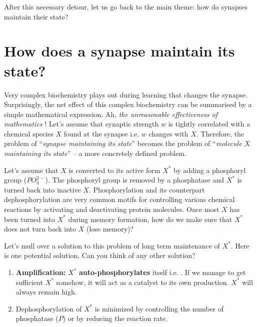 \documentclass[]{resonance}
\begin{document}
After this necessary detour, let us go back to the main theme: how do synapses
maintain their state?

\section{How does a synapse maintain its state?}

Very complex biochemistry plays out during learning that changes the synapse.
Surprisingly, the net effect of this complex biochemistry can be summarised by a
simple mathematical expression. Ah, \emph{the unreasonable effectiveness of
mathematics} \cite{unreasonable_math}! Let's assume that synaptic strength $w$ is
tightly correlated with a chemical species $X$ found at the synapse i.e. $w$ changes
with $X$. Therefore, the problem of ``\emph{synapse
maintaining its state}'' becomes the problem of ``\emph{molecule $X$ maintaining
its state}'' -- a more concretely defined problem.

Let's assume that $X$ is converted to its active form $X^*$  by adding a
phosphoryl group ($PO_3^{2-}$). The phosphoryl group is removed by a phosphatase
and $X^*$ is turned back into inactive $X$. Phosphorylation and its
counterpart dephosphorylation are very common motifs for controlling various
chemical reactions by activating and deactivating protein molecules. Once most
$X$ has been turned into $X^*$ during memory formation, how do we make sure that
$X^*$ does not turn back into $X$ (lose memory)?

Let's mull over a solution to this problem of long term maintenance of $X^*$.
Here is one potential solution. Can you think of any other solution?

\begin{enumerate}
    \item \textbf{Amplification:} $X^*$ \textbf{auto-phosphorylates} itself i.e. 
        .
        If we manage to get sufficient $X^*$ somehow, it
        will act as a catalyst to its own production. $X^*$ will always remain
        high.
    \item Dephosphorylation of $X^*$ is minimized by controlling the number of
        phosphatase ($P$) or by reducing the reaction rate.
\end{enumerate} 
\end{document}
